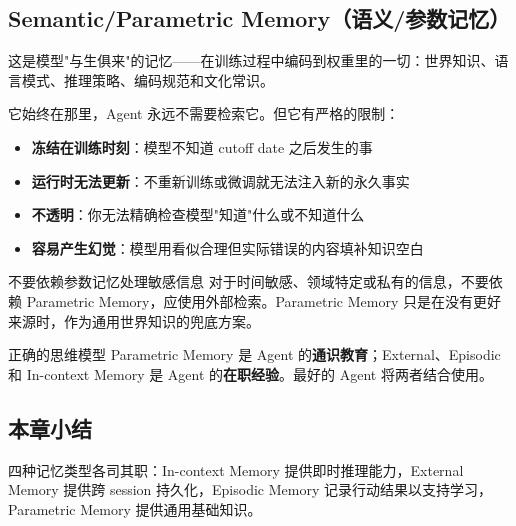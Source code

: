 \subsection{Semantic/Parametric Memory（语义/参数记忆）}

这是模型"与生俱来"的记忆——在训练过程中编码到权重里的一切：世界知识、语言模式、推理策略、编码规范和文化常识。

它始终在那里，Agent 永远不需要检索它。但它有严格的限制：

\begin{itemize}[leftmargin=2em]
    \item \textbf{冻结在训练时刻}：模型不知道 cutoff date 之后发生的事
    \item \textbf{运行时无法更新}：不重新训练或微调就无法注入新的永久事实
    \item \textbf{不透明}：你无法精确检查模型"知道"什么或不知道什么
    \item \textbf{容易产生幻觉}：模型用看似合理但实际错误的内容填补知识空白
\end{itemize}

\begin{warningbox}{不要依赖参数记忆处理敏感信息}
对于时间敏感、领域特定或私有的信息，不要依赖 Parametric Memory，应使用外部检索。Parametric Memory 只是在没有更好来源时，作为通用世界知识的兜底方案。
\end{warningbox}

\begin{importantbox}{正确的思维模型}
Parametric Memory 是 Agent 的\textbf{通识教育}；External、Episodic 和 In-context Memory 是 Agent 的\textbf{在职经验}。最好的 Agent 将两者结合使用。
\end{importantbox}

\subsection{本章小结}

四种记忆类型各司其职：In-context Memory 提供即时推理能力，External Memory 提供跨 session 持久化，Episodic Memory 记录行动结果以支持学习，Parametric Memory 提供通用基础知识。

